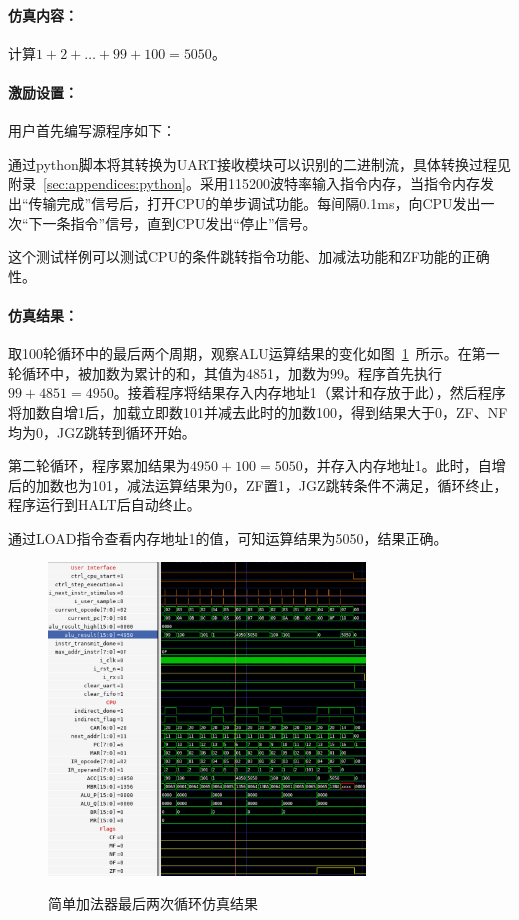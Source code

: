 \documentclass[lang=cn,a4paper,newtx]{elegantpaper}
\begin{document}
\paragraph{仿真内容：}

计算$1+2+\dots +99 +100 =5050$。

\paragraph{激励设置：}

用户首先编写源程序如下：


通过python脚本将其转换为UART接收模块可以识别的二进制流，具体转换过程见附录~\ref{sec:appendices:python}。采用115200波特率输入指令内存，当指令内存发出“传输完成”信号后，打开CPU的单步调试功能。每间隔0.1ms，向CPU发出一次“下一条指令”信号，直到CPU发出“停止”信号。

这个测试样例可以测试CPU的条件跳转指令功能、加减法功能和ZF功能的正确性。
\paragraph{仿真结果：}
取100轮循环中的最后两个周期，观察ALU运算结果的变化如图~\ref{fig:sim:1}~所示。在第一轮循环中，被加数为累计的和，其值为4851，加数为99。程序首先执行$99 +4851 = 4950$。接着程序将结果存入内存地址1（累计和存放于此），然后程序将加数自增1后，加载立即数101并减去此时的加数100，得到结果大于0，ZF、NF均为0，JGZ跳转到循环开始。

第二轮循环，程序累加结果为$4950+100 = 5050$，并存入内存地址1。此时，自增后的加数也为101，减法运算结果为0，ZF置1，JGZ跳转条件不满足，循环终止，程序运行到HALT后自动终止。

通过LOAD指令查看内存地址1的值，可知运算结果为5050，结果正确。

\begin{figure}[htbp]
  \centering
  \caption{简单加法器最后两次循环仿真结果}
  \includegraphics[width = 0.75\textwidth]{figure/cpu_sim_add.png}
  \label{fig:sim:1}
\end{figure}
\end{document}
